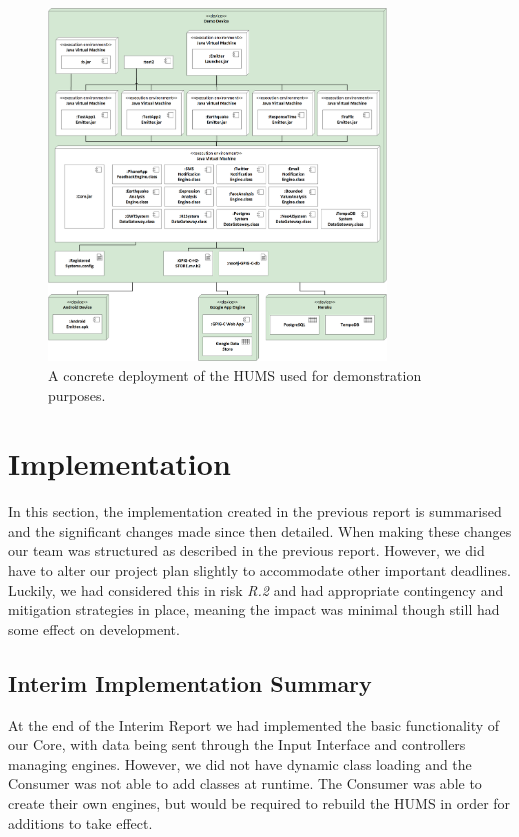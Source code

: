 \documentclass[10pt,a4paper]{article}
\begin{document}
\begin{figure}[ht]
  \centering
  \includegraphics[width=0.8\textwidth]{images/Demo.png}
  \caption{A concrete deployment of the HUMS used for demonstration purposes.}
  \label{fig:deploydemo}
\end{figure}


\section{Implementation}
\label{sec:dev}
In this section, the implementation created in the previous report is summarised and the significant changes made since then detailed. When making these changes our team was structured as described in the previous report. However, we did have to alter our project plan slightly to accommodate other important deadlines. Luckily, we had considered this in risk \emph{R.2} and had appropriate contingency and mitigation strategies in place, meaning the impact was minimal though still had some effect on development.

\subsection{Interim Implementation Summary}
\label{sec:interim_summary}
At the end of the Interim Report we had implemented the basic functionality of our Core, with data being sent through the Input Interface and controllers managing engines. However, we did not have dynamic class loading and the Consumer was not able to add classes at runtime. The Consumer was able to create their own engines, but would be required to rebuild the HUMS in order for additions to take effect.
\end{document}
